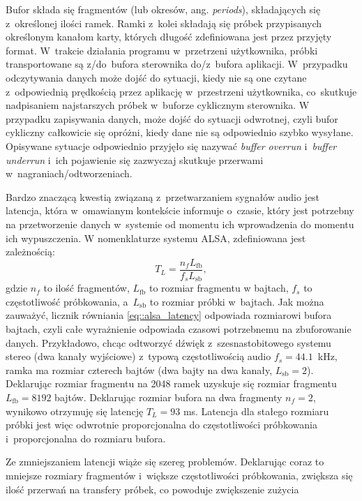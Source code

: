 Bufor składa się fragmentów (lub okresów, ang. \textit{periods}), składających
się z~określonej ilości ramek. Ramki z~kolei składają się próbek przypisanych
określonym kanałom karty, których długość zdefiniowana jest przez przyjęty
format. W~trakcie działania programu w~przetrzeni użytkownika, próbki
transportowane są z/do~bufora sterownika do/z~bufora aplikacji. W~przypadku
odczytywania danych może dojść do sytuacji, kiedy nie są one czytane
z~odpowiednią prędkością przez aplikację w~przestrzeni użytkownika, co~skutkuje
nadpisaniem najstarszych próbek w~buforze cyklicznym sterownika. W przypadku
zapisywania danych, może dojść do sytuacji odwrotnej, czyli bufor cykliczny
całkowicie się opróżni, kiedy dane nie są odpowiednio szybko wysyłane. Opisywane
sytuacje odpowiednio przyjęło się nazywać \textit{buffer overrun}
i~\textit{buffer underrun} i~ich pojawienie się zazwyczaj skutkuje przerwami
w~nagraniach/odtworzeniach. \par Bardzo znaczącą kwestią związaną
z~przetwarzaniem sygnałów audio jest latencja, która w~omawianym kontekście
informuje o~czasie, który jest potrzebny na przetworzenie danych w~systemie od
momentu ich wprowadzenia do momentu ich wypuszczenia. W nomenklaturze systemu
ALSA, zdefiniowana jest zależnością:
\begin{equation}
    T_L = \frac{n_fL_{\text{fb}}}{f_sL_{\text{sb}}},
    \label{eq::alsa_latency}
\end{equation}
gdzie $n_f$ to ilość fragmentów, $L_{\text{fb}}$ to rozmiar fragmentu w bajtach,
$f_s$ to częstotliwość próbkowania, a~$L_{\text{sb}}$ to rozmiar próbki
w~bajtach. Jak można zauważyć, licznik równiania \ref{eq::alsa_latency}
odpowiada rozmiarowi bufora bajtach, czyli całe wyrażnienie odpowiada czasowi
potrzebnemu na zbuforowanie danych. Przykładowo, chcąc odtworzyć dźwięk
z~szesnastobitowego systemu stereo (dwa kanały wyjściowe) z~typową
częstotliwością audio $f_s = 44.1$~kHz, ramka ma rozmiar czterech bajtów (dwa
bajty na dwa kanały, $L_{\text{sb}} = 2$). Deklarując rozmiar fragmentu na 2048
ramek uzyskuje się rozmiar fragmentu $L_{\text{fb}} = 8192$ bajtów. Deklarując
rozmiar bufora na dwa fragmenty $n_f = 2$, wynikowo otrzymuję się latencję $T_L
= 93$ ms. Latencja dla stałego rozmiaru próbki jest więc odwrotnie
proporcjonalna do częstotliwości próbkowania i~proporcjonalna do rozmiaru
bufora. \par Ze zmniejszaniem latencji wiąże się szereg problemów. Deklarując
coraz to mniejsze rozmiary fragmentów i~większe częstotliwości próbkowania,
zwiększa się ilość przerwań na transfery próbek, co powoduje zwiększenie zużycia
